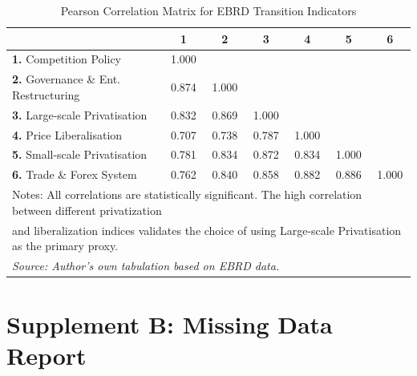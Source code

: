\documentclass[en,magisterska]{pracamgr}
\begin{document}
\begin{table}[H]
\centering
\caption{Pearson Correlation Matrix for EBRD Transition Indicators}
\label{tab:ebrd_corr}
\footnotesize
\begin{tabular}{l c c c c c c}
\toprule
 & \textbf{1} & \textbf{2} & \textbf{3} & \textbf{4} & \textbf{5} & \textbf{6} \\
\midrule
\textbf{1.} Competition Policy & 1.000 & & & & & \\
\textbf{2.} Governance \& Ent. Restructuring & 0.874 & 1.000 & & & & \\
\textbf{3.} Large-scale Privatisation & 0.832 & 0.869 & 1.000 & & & \\
\textbf{4.} Price Liberalisation & 0.707 & 0.738 & 0.787 & 1.000 & & \\
\textbf{5.} Small-scale Privatisation & 0.781 & 0.834 & 0.872 & 0.834 & 1.000 & \\
\textbf{6.} Trade \& Forex System & 0.762 & 0.840 & 0.858 & 0.882 & 0.886 & 1.000 \\
\bottomrule
\multicolumn{7}{l}{\scriptsize Notes: All correlations are statistically significant. The high correlation between different privatization} \\
\multicolumn{7}{l}{\scriptsize and liberalization indices validates the choice of using Large-scale Privatisation as the primary proxy.} \\
\multicolumn{7}{l}{\scriptsize \textit{Source: Author's own tabulation based on EBRD data.}} \\
\end{tabular}
\end{table}

\vspace{1cm}

\section*{Supplement B: Missing Data Report}
\end{document}
